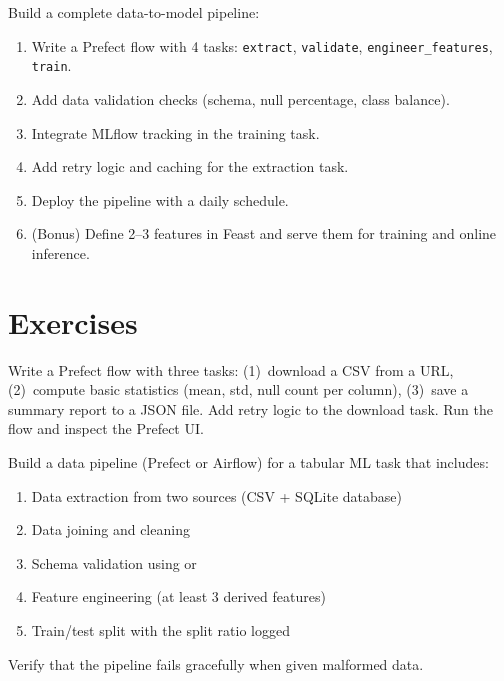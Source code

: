 \begin{miniproject}[title=\textbf{Mini-project 5: End-to-end orchestrated pipeline}]
Build a complete data-to-model pipeline:
\begin{enumerate}
  \item Write a Prefect flow with 4 tasks: \texttt{extract},
    \texttt{validate}, \texttt{engineer\_features}, \texttt{train}.
  \item Add data validation checks (schema, null percentage, class
    balance).
  \item Integrate MLflow tracking in the training task.
  \item Add retry logic and caching for the extraction task.
  \item Deploy the pipeline with a daily schedule.
  \item (Bonus) Define 2--3 features in Feast and serve them for
    training and online inference.
\end{enumerate}
\end{miniproject}

\section{Exercises}
\label{sec:exercises-ch5}

\begin{exercise}
Write a Prefect flow with three tasks: (1)~download a CSV from a URL,
(2)~compute basic statistics (mean, std, null count per column),
(3)~save a summary report to a JSON file. Add retry logic to the download
task. Run the flow and inspect the Prefect UI.
\end{exercise}

\begin{exercise}
Build a data pipeline (Prefect or Airflow) for a tabular ML task that
includes:
\begin{enumerate}
  \item Data extraction from two sources (CSV + SQLite database)
  \item Data joining and cleaning
  \item Schema validation using  or 
  \item Feature engineering (at least 3 derived features)
  \item Train/test split with the split ratio logged
\end{enumerate}
Verify that the pipeline fails gracefully when given malformed data.
\end{exercise}

